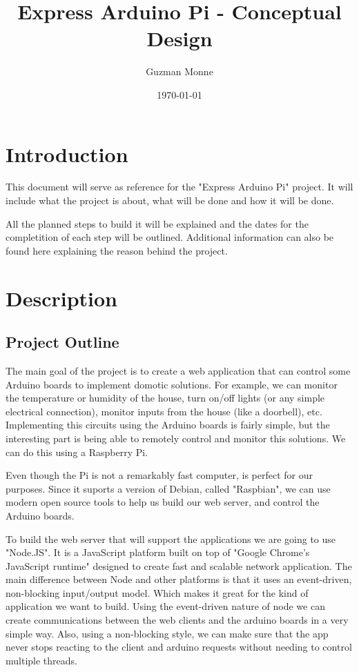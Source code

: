\documentclass[a4paper]{article}
\title{Express Arduino Pi - Conceptual Design}
\author{Guzman Monne}
\date{\today}
\begin{document}
\maketitle

\section{Introduction}

This document will serve as reference for the "Express Arduino Pi" project. It will include what the project is about, what will be done and how it will be done. 

All the planned steps to build it will be explained and the dates for the completition of each step will be outlined. Additional information can also be found here explaining the reason behind the project.

\section{Description}
\label{sec:description}

\subsection{Project Outline}

The main goal of the project is to create a web application that can control some Arduino boards to implement domotic solutions. For example, we can monitor the temperature or humidity of the house, turn on/off lights (or any simple electrical connection), monitor inputs from the house (like a doorbell), etc. Implementing this circuits using the Arduino boards is fairly simple, but the interesting part is being able to remotely control and monitor this solutions. We can do this using a Raspberry Pi.

Even though the Pi is not a remarkably fast computer, is perfect for our purposes. Since it suports a version of Debian, called "Raspbian", we can use modern open source tools to help us build our web server, and control the Arduino boards.

To build the web server that will support the applications we are going to use "Node.JS". It is a JavaScript platform built on top of "Google Chrome's JavaScript runtime" designed to create fast and scalable network application. The main difference between Node and other platforms is that it uses an event-driven, non-blocking input/output model. Which makes it great for the kind of application we want to build. Using the event-driven nature of node we can create communications between the web clients and the arduino boards in a very simple way. Also, using a non-blocking style, we can make sure that the app never stops reacting to the client and arduino requests without needing to control multiple threads.
\end{document}
